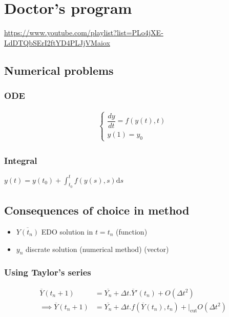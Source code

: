 \documentclass[11pt]{article}
\date{\today}
\title{}
\begin{document}
\tableofcontents


\section{Doctor's program}
\label{sec:orgf8bc38e}
\url{https://www.youtube.com/playlist?list=PLo4jXE-LdDTQbSErI2ftYD4PLJjVMaiox}
\subsection{Numerical problems}
\label{sec:org134914c}
\subsubsection{ODE}
\label{sec:org0bd1a8c}
\begin{equation}
\begin{aligned}
\begin{cases}
\dfrac{dy}{dt} = f(y(t),t)\\
y(1) = y_0
\end{cases}
\end{aligned}
\end{equation}

\subsubsection{Integral}
\label{sec:org83c15b8}
\(y(t) = y(t_0) + \int_{t_{0}}^t{f(y(s),s)}\text{d}s\)
\subsection{Consequences of choice in method}
\label{sec:org1ee5dfb}

\begin{itemize}
\item \(\overline{Y(t_n)}\) EDO solution in \(t=t_n\) (function)
\item \(y_n\) discrate solution (numerical method) (vector)
\end{itemize}

\subsubsection{Using Taylor's series}
\label{sec:org2239bd0}
\begin{equation}
\begin{aligned}
\overline{Y}(t_n+1) &= \overline{Y_n}+\Delta{t}.\overline{Y}'(t_n) + O(\Delta{t}^2) \\
\implies \overline{Y}(t_n+1) &= \overline{Y_n}+\Delta{t}.f(\overline{Y}(t_n), t_n)  + \biggr\rvert_{\text{cut}} O(\Delta{t}^2)
\end{aligned}
\end{equation}
\end{document}
